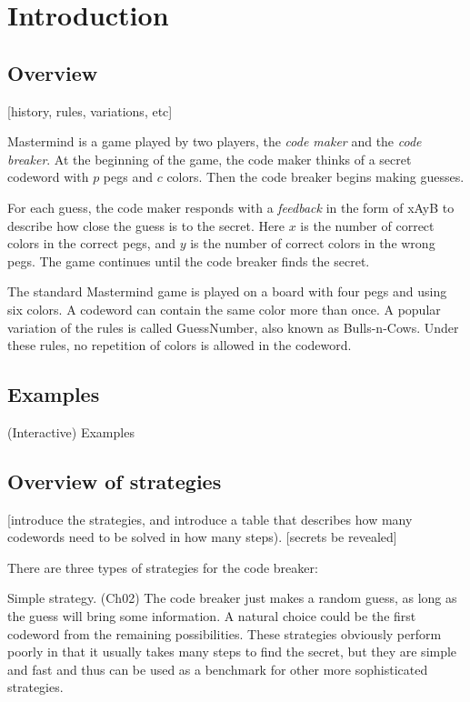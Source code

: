 \section{Introduction}

\subsection{Overview}

[history, rules, variations, etc]

Mastermind is a game played by two players, the \emph{code maker} and the \emph{code breaker}. At the beginning of the game, the code maker thinks of a secret codeword with $p$ pegs and $c$ colors. Then the code breaker begins making guesses.

For each guess, the code maker responds with a \emph{feedback} in the form of xAyB to describe how close the guess is to the secret. Here $x$ is the number of correct colors in the correct pegs, and $y$ is the number of correct colors in the wrong pegs. The game continues until the code breaker finds the secret.

The standard Mastermind game is played on a board with four pegs and using six colors. A codeword can contain the same color more than once. A popular variation of the rules is called GuessNumber, also known as Bulls-n-Cows. Under these rules, no repetition of colors is allowed in the codeword.

\subsection{Examples}

(Interactive) Examples

\subsection{Overview of strategies}

[introduce the strategies, and introduce a table that describes how many codewords need to be solved in how many steps). [secrets be revealed]

There are three types of strategies for the code breaker:

Simple strategy. (Ch02) The code breaker just makes a random guess, as long as the guess will bring some information. A natural choice could be the first codeword from the remaining possibilities. These strategies obviously perform poorly in that it usually takes many steps to find the secret, but they are simple and fast and thus can be used as a benchmark for other more sophisticated strategies.

